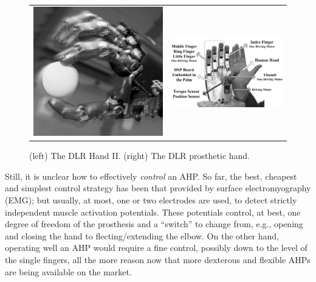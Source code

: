 \begin{figure}
  \begin{tabular}{cc}
    \includegraphics[height=0.12\textheight]{figs/DLRHand-Ball-comp.jpg} &
    \includegraphics[height=0.12\textheight]{figs/DLR-Prothese.jpg}
  \end{tabular}
  \caption{(left) The DLR Hand II. (right) The DLR prosthetic hand.}
  \label{fig:DLRHandII}
\end{figure}

Still, it is unclear how to effectively \emph{control} an AHP. So far,
the best, cheapest and simplest control strategy has been that
provided by surface electromyography (EMG); but usually, at most, one
or two electrodes are used, to detect strictly independent muscle
activation potentials. These potentials control, at best, one degree
of freedom of the prosthesis and a ``switch'' to change from, e.g.,
opening and closing the hand to flecting/extending the elbow. On the
other hand, operating well an AHP would require a fine control,
possibly down to the level of the single fingers, all the more reason
now that more dexterous and flexible AHPs are being available on the
market.

